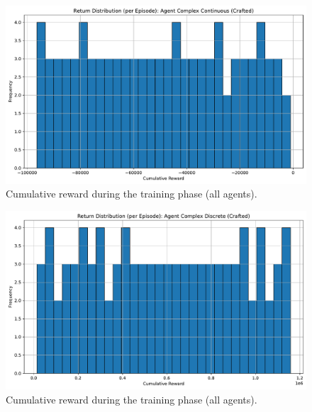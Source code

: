 \documentclass[sigconf]{acmart}
\begin{document}
\begin{figure}[t]
  \centering
  \includegraphics[width=\textwidth]{return_distribution_Complex Continuous (Crafted).pdf}
  \caption{Cumulative reward during the training phase (all agents).}
  \label{fig:return_distribution_Complex Continuous (Crafted)}
\end{figure}


\begin{figure}[t]
  \centering
  \includegraphics[width=\textwidth]{return_distribution_Complex Discrete (Crafted).pdf}
  \caption{Cumulative reward during the training phase (all agents).}
  \label{fig:return_distribution_Complex Discrete (Crafted)}
\end{figure}
\end{document}
